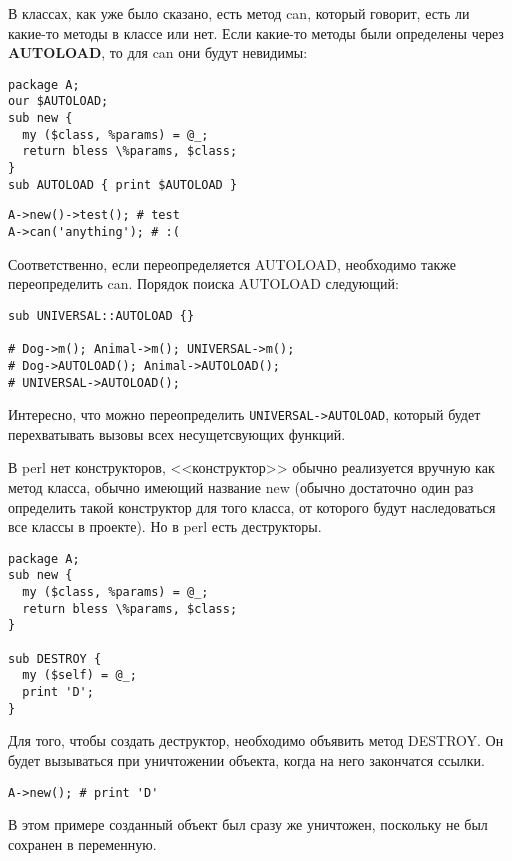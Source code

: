 В классах, как уже было сказано, есть метод can, который говорит, есть ли какие-то методы в классе или нет. Если какие-то методы были определены через \textbf{AUTOLOAD}, то для can они будут невидимы:
\begin{verbatim}
package A;
our $AUTOLOAD;
sub new {
  my ($class, %params) = @_;
  return bless \%params, $class;
}
sub AUTOLOAD { print $AUTOLOAD }
\end{verbatim}
\begin{verbatim}
A->new()->test(); # test
A->can('anything'); # :(
\end{verbatim}
Соответственно, если переопределяется AUTOLOAD, необходимо также переопределить can. Порядок поиска AUTOLOAD следующий:
\begin{verbatim}
sub UNIVERSAL::AUTOLOAD {}

# Dog->m(); Animal->m(); UNIVERSAL->m();
# Dog->AUTOLOAD(); Animal->AUTOLOAD();
# UNIVERSAL->AUTOLOAD();
\end{verbatim}
Интересно, что можно переопределить \verb|UNIVERSAL->AUTOLOAD|, который будет перехватывать вызовы всех несущетсвующих функций.

В perl нет конструкторов, <<конструктор>> обычно реализуется вручную как метод класса, обычно имеющий название new (обычно достаточно один раз определить такой конструктор для того класса, от которого будут наследоваться все классы в проекте). Но в perl есть деструкторы.
\begin{verbatim}
package A;
sub new {
  my ($class, %params) = @_;
  return bless \%params, $class;
}

sub DESTROY {
  my ($self) = @_;
  print 'D';
}
\end{verbatim}
Для того, чтобы создать деструктор, необходимо объявить метод DESTROY. Он будет вызываться при уничтожении объекта, когда на него закончатся ссылки.
\begin{verbatim}
A->new(); # print 'D'
\end{verbatim}
В этом примере созданный объект был сразу же уничтожен, поскольку не был сохранен в переменную.

